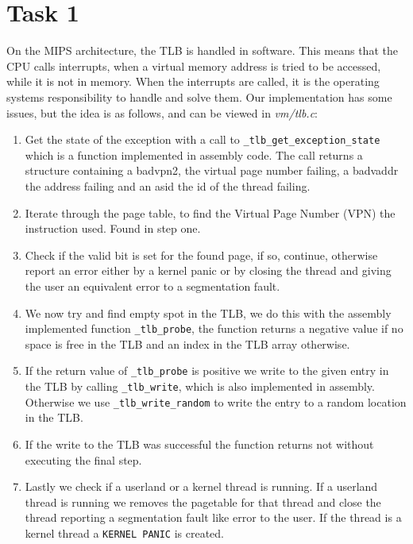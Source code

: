 \documentclass[11pt]{article}
\begin{document}
\section*{Task 1}
On the MIPS architecture, the TLB is handled in software. This means that the CPU calls interrupts, when a virtual memory address is tried to be accessed, while it is not in memory. When the interrupts are called, it is the operating systems responsibility to handle and solve them.
Our implementation has some issues, but the idea is as follows, and can be
viewed in \textit{vm/tlb.c}:
\begin{enumerate}
    \item Get the state of the exception with a call to
        \texttt{\_tlb_get\_exception\_state} which is a function implemented in
        assembly code.  The call returns a structure containing a badvpn2, the
        virtual page number failing, a badvaddr the address failing and an asid
        the id of the thread failing.
    \item Iterate through the page table, to find the Virtual Page Number (VPN)
        the instruction used.  Found in step one.
    \item Check if the valid bit is set for the found page, if so, continue,
        otherwise report an error either by a kernel panic or by closing the
        thread and giving the user an equivalent error to a segmentation fault.
    \item We now try and find empty spot in the TLB, we do this with the
        assembly implemented function \texttt{\_tlb\_probe}, the function
        returns a negative value if no space is free in the TLB and an index in
        the TLB array otherwise.
    \item If the return value of \texttt{\_tlb\_probe} is positive we write to
        the given entry in the TLB by calling \texttt{\_tlb\_write}, which is
        also implemented in assembly.  Otherwise we use
        \texttt{\_tlb\_write\_random} to write the entry to a random location in
        the TLB.
    \item If the write to the TLB was successful the function returns not
        without executing the final step.
    \item Lastly we check if a userland or a kernel thread is running.  If a
        userland thread is running we removes the pagetable for that thread and
        close the thread reporting a segmentation fault like error to the user.
        If the thread is a kernel thread a \texttt{KERNEL PANIC} is created.
\end{enumerate}
\end{document}
